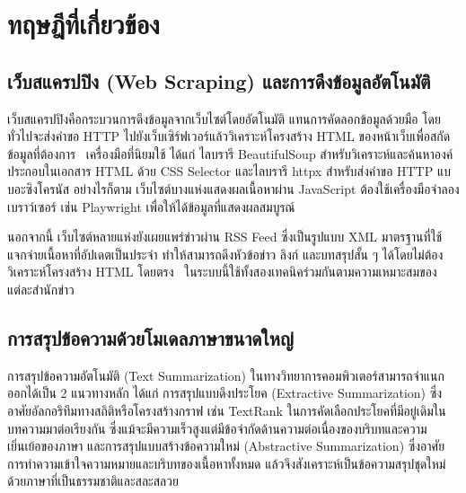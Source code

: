 
\section{ทฤษฎีที่เกี่ยวข้อง}

\subsection{เว็บสแครปปิง (Web Scraping) และการดึงข้อมูลอัตโนมัติ}

เว็บสแครปปิงคือกระบวนการดึงข้อมูลจากเว็บไซต์โดยอัตโนมัติ แทนการคัดลอกข้อมูลด้วยมือ โดยทั่วไปจะส่งคำขอ HTTP ไปยังเว็บเซิร์ฟเวอร์แล้ววิเคราะห์โครงสร้าง HTML ของหน้าเว็บเพื่อสกัดข้อมูลที่ต้องการ~\cite{barbaresi-2021-trafilatura} เครื่องมือที่นิยมใช้ ได้แก่ ไลบรารี BeautifulSoup สำหรับวิเคราะห์และค้นหาองค์ประกอบในเอกสาร HTML ด้วย CSS Selector และไลบรารี httpx สำหรับส่งคำขอ HTTP แบบอะซิงโครนัส อย่างไรก็ตาม เว็บไซต์บางแห่งแสดงผลเนื้อหาผ่าน JavaScript ต้องใช้เครื่องมือจำลองเบราว์เซอร์ เช่น Playwright เพื่อให้ได้ข้อมูลที่แสดงผลสมบูรณ์

นอกจากนี้ เว็บไซต์หลายแห่งยังเผยแพร่ข่าวผ่าน RSS Feed ซึ่งเป็นรูปแบบ XML มาตรฐานที่ใช้แจกจ่ายเนื้อหาที่อัปเดตเป็นประจำ ทำให้สามารถดึงหัวข้อข่าว ลิงก์ และบทสรุปสั้น ๆ ได้โดยไม่ต้องวิเคราะห์โครงสร้าง HTML โดยตรง~\cite{rss2009} ในระบบนี้ใช้ทั้งสองเทคนิคร่วมกันตามความเหมาะสมของแต่ละสำนักข่าว

\subsection{การสรุปข้อความด้วยโมเดลภาษาขนาดใหญ่}

การสรุปข้อความอัตโนมัติ (Text Summarization) ในทางวิทยาการคอมพิวเตอร์สามารถจำแนกออกได้เป็น 2 แนวทางหลัก ได้แก่ การสรุปแบบดึงประโยค (Extractive Summarization) ซึ่งอาศัยอัลกอริทึมทางสถิติหรือโครงสร้างกราฟ เช่น TextRank ในการคัดเลือกประโยคที่มีอยู่เดิมในบทความมาต่อเรียงกัน ซึ่งแม้จะมีความเร็วสูงแต่มีข้อจำกัดด้านความต่อเนื่องของบริบทและความเยิ่นเย้อของภาษา และการสรุปแบบสร้างข้อความใหม่ (Abstractive Summarization) ซึ่งอาศัยการทำความเข้าใจความหมายและบริบทของเนื้อหาทั้งหมด แล้วจึงสังเคราะห์เป็นข้อความสรุปชุดใหม่ด้วยภาษาที่เป็นธรรมชาติและสละสลวย~\cite{allahyari2017}

